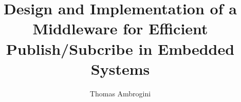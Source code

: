 
\newcommand{\mytitle}{Design and Implementation of a Middleware for Efficient
       Publish/Subcribe in Embedded Systems}

\title{Design and Implementation of a Middleware for Efficient
       Publish/Subcribe in Embedded Systems}

\author{Thomas Ambrogini}
